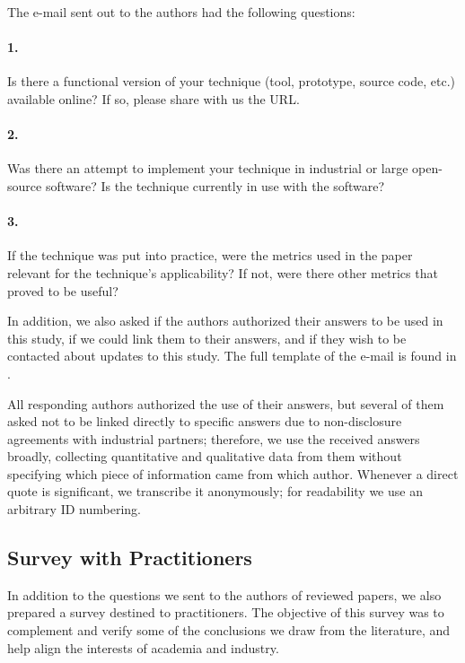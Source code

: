 The e-mail sent out to the authors had the following questions:

\begin{tcolorbox}%
\small
\paragraph{1.}  Is there a functional version of your technique (tool, prototype, source code, etc.) available online? If so, please share with us the URL.

\paragraph{2.} Was there an attempt to implement your technique in industrial or large open-source software? Is the technique currently in use with the software?

\paragraph{3.} If the technique was put into practice, were the metrics used in the paper relevant for the technique’s applicability? If not, were there other metrics that proved to be useful?
\end{tcolorbox}

In addition, we also asked if the authors authorized their answers to be used in this study, if we could link them to their answers, and if they wish to be contacted about updates to this study.
The full template of the e-mail is found in .

All responding authors authorized the use of their answers, but several of them asked not to be linked directly to specific answers due to non-disclosure agreements with industrial partners; therefore, we use the received answers broadly, collecting quantitative and qualitative data from them without specifying which piece of information came from which author.
Whenever a direct quote is significant, we transcribe it anonymously; for readability we use an arbitrary ID numbering.

\subsection{Survey with Practitioners}
\label{subsec:prac_survey}

In addition to the questions we sent to the authors of reviewed papers, we also prepared a survey destined to practitioners.
The objective of this survey was to complement and verify some of the conclusions we draw from the literature, and help align the interests of academia and industry.

